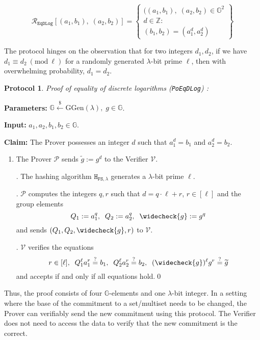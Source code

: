 \documentclass[11pt, lettersize, notitlepage, leqno, footskip=0.6cm]{article}
\newcommand{\ttt}{\texttt}
\newcommand{\wti}{\widetilde}
\newcommand{\mc}{\mathcal}
\newcommand{\mb}{\mathbb}
\newcommand{\mr}{\mathrm}
\newcommand{\lam}{\lambda}
\newcommand{\lamb}{\lambda}
\newcommand{\weck}{\widecheck}
\newcommand{\vs}{\vspace{-0.15cm}}
\newcommand{\noin}{\noindent}
\newcommand{\op}{overwhelming probability}
\newcommand{\sta}{\stackrel{?}{=}}
\newcommand{\Mod}[1]{\ (\mathrm{mod}\ #1)}
\newtheorem{Prot}[Thm]{Protocol}
\numberwithin{equation}{section}
\begin{document}
\[
  \mc{R}_{\ttt{EqDLog}}[(a_1, b_1),\;(a_2,b_2)] = \left\{\begin{array}{l}
    ((a_1, b_1),\; (a_2,b_2)\in\mb{G}^2\\
    d\in\mb{Z}: \\
    (b_1,b_2) = (a_1^d,a_2^d)
  \end{array}\right\}
\] \vspace{0.1cm}

\noin The protocol hinges on the observation that for two integers $d_1,d_2$, if we have $d_1\equiv d_2\Mod{\ell}$ for a randomly generated $\lam$-bit prime $\ell$, then with \op, $d_1= d_2$.

\vspace{0.15cm}


\begin{Prot}\label{EqDLog} \normalfont \textit{Proof of equality of discrete logarithms} (\verb|PoEqDLog|) :\end{Prot} \vspace{-0.3cm}

\noindent \textbf{Parameters:} $\mb{G}\xleftarrow{\$} \mr{GGen}(\lamb), \; g\in \mb{G}$.

\noindent \textbf{Input:} $a_1, a_2, b_1, b_2 \in \mb{G}$.

\noindent \textbf{Claim:} The Prover possesses an integer $d$ such that $a_1^d = b_1$ and $a_2^d = b_2$.

\begin{enumerate}[wide, labelwidth=!, labelindent=0pt]\vs \item The Prover $\mc{P}$ sends $\wti{g} := g^d$ to the Verifier $\mc{V}$. \vs

\noin 2. The hashing algorithm $\ttt{H}_{\ttt{FS},\lam}$ generates a $\lamb$-bit prime $\ell$. \vs

\noin 3. $\mc{P}$ computes the integers $q, r$ such that $d = q \cdot \ell+r$, $r\in [\ell]$ and the group elements \vs $$Q_1:= a_1^q,\;\; Q_2:= a_2^q,\;\; \weck{g}:= g^q$$ and sends $(Q_1, Q_2, \weck{g}, r)$ to $\mc{V}$. \vs

\noin 4. $\mc{V}$ verifies the equations \vs $$r\in [\ell],\;\;Q_1^{\ell}a_1^r \sta  b_1, \;\; Q_2^{\ell}a_2^r \sta  b_2, \;\; (\weck{g})^{\ell}g^r \sta \wti{g}$$ and accepts if and only if all equations hold.\qed \end{enumerate}

\noin Thus, the proof consists of four $\mb{G}$-elements and one $\lam$-bit integer. In a setting where the base of the commitment to a set/multiset needs to be changed, the Prover can verifiably send the new commitment using this protocol. The Verifier does not need to access the data to verify that the new commitment is the correct. 
\end{document}
